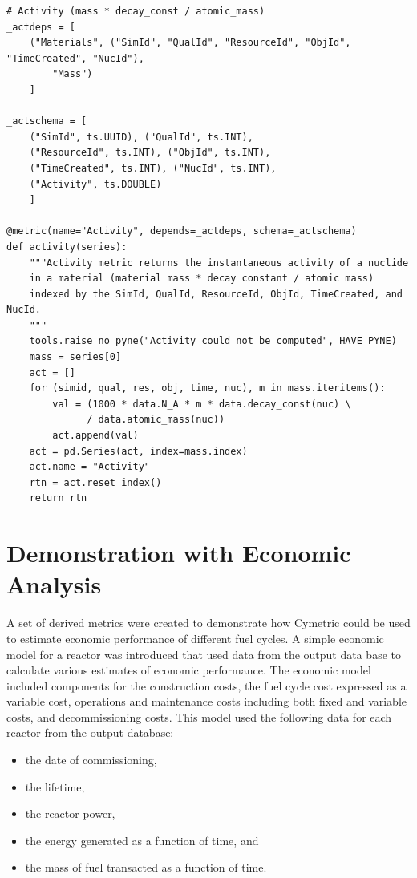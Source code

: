\begin{lstlisting}[caption={A sample derived metric in Cymetric}, 
                   label=sample_metric]
# Activity (mass * decay_const / atomic_mass)
_actdeps = [
    ("Materials", ("SimId", "QualId", "ResourceId", "ObjId", "TimeCreated", "NucId"),
        "Mass")
    ]

_actschema = [
    ("SimId", ts.UUID), ("QualId", ts.INT),
    ("ResourceId", ts.INT), ("ObjId", ts.INT),
    ("TimeCreated", ts.INT), ("NucId", ts.INT),
    ("Activity", ts.DOUBLE)
    ]

@metric(name="Activity", depends=_actdeps, schema=_actschema)
def activity(series):
    """Activity metric returns the instantaneous activity of a nuclide
    in a material (material mass * decay constant / atomic mass)
    indexed by the SimId, QualId, ResourceId, ObjId, TimeCreated, and NucId.
    """
    tools.raise_no_pyne("Activity could not be computed", HAVE_PYNE)
    mass = series[0]
    act = []
    for (simid, qual, res, obj, time, nuc), m in mass.iteritems():
        val = (1000 * data.N_A * m * data.decay_const(nuc) \
              / data.atomic_mass(nuc))
        act.append(val)
    act = pd.Series(act, index=mass.index)
    act.name = "Activity"
    rtn = act.reset_index()
    return rtn
\end{lstlisting}

\section{Demonstration with Economic Analysis}

A set of derived metrics were created to demonstrate how Cymetric could be
used to estimate economic performance of different fuel cycles.  A simple
economic model for a reactor was introduced that used data from the \Cyclus
output data base to calculate various estimates of economic performance.  The
economic model included components for the construction costs, the fuel cycle
cost expressed as a variable cost, operations and maintenance costs including
both fixed and variable costs, and decommissioning costs.  This model used the
following data for each reactor from the \Cyclus output database:
\begin{itemize}
\item the date of commissioning,
\item the lifetime,
\item the reactor power,
\item the energy generated as a function of time, and
\item the mass of fuel transacted as a function of time.
\end{itemize}

